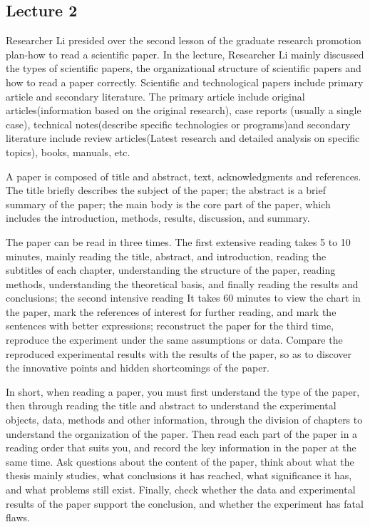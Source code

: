 \documentclass[UTF-8]{ctexart}
\begin{document}
\subsection{Lecture 2}
Researcher Li presided over the second lesson of the graduate research promotion plan-how to read a scientific paper. In the lecture, Researcher Li mainly discussed the types of scientific papers, the organizational structure of scientific papers and how to read a paper correctly.
Scientific and technological papers include primary article and secondary literature. The primary article include original articles(information based on the original research), case reports (usually a single case), technical notes(describe specific technologies or programs)and secondary literature include review articles(Latest research and detailed analysis on specific topics), books, manuals, etc.

A paper is composed of title and abstract, text, acknowledgments and references. The title briefly describes the subject of the paper; the abstract is a brief summary of the paper; the main body is the core part of the paper, which includes the introduction, methods, results, discussion, and summary.

The paper can be read in three times. The first extensive reading takes 5 to 10 minutes, mainly reading the title, abstract, and introduction, reading the subtitles of each chapter, understanding the structure of the paper, reading methods, understanding the theoretical basis, and finally reading the results and conclusions; the second intensive reading It takes 60 minutes to view the chart in the paper, mark the references of interest for further reading, and mark the sentences with better expressions; reconstruct the paper for the third time, reproduce the experiment under the same assumptions or data. Compare the reproduced experimental results with the results of the paper, so as to discover the innovative points and hidden shortcomings of the paper.

In short, when reading a paper, you must first understand the type of the paper, then through reading the title and abstract to understand the experimental objects, data, methods and other information, through the division of chapters to understand the organization of the paper. Then read each part of the paper in a reading order that suits you, and record the key information in the paper at the same time. Ask questions about the content of the paper, think about what the thesis mainly studies, what conclusions it has reached, what significance it has, and what problems still exist. Finally, check whether the data and experimental results of the paper support the conclusion, and whether the experiment has fatal flaws.
\end{document}
